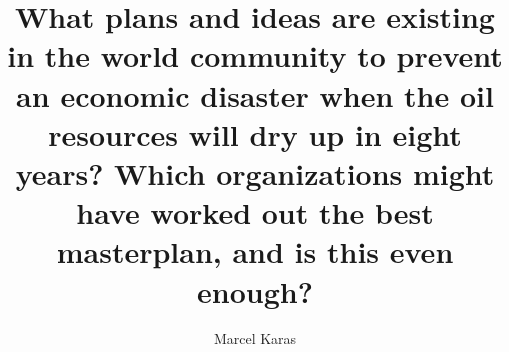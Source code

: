

\thispagestyle{otherpage} %
\title{What plans and ideas are existing in the world community to prevent an economic disaster when the oil resources will dry up in eight years? Which organizations might have worked out the best masterplan, and is this even enough?}
\author{Marcel Karas}

\maketitle
\newpage
\tableofcontents
\newpage
\vfill

\vfill

\vfill

\vfill
\newpage
\printbibliography


